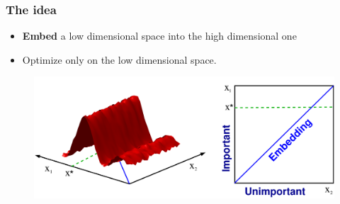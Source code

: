 \documentclass[grey]{beamer}
\begin{document}
  \begin{frame}
  \frametitle{The idea} 
   \begin{itemize}
    \item {\bf \textcolor{myColor}{Embed}} 
     a low dimensional space into the high dimensional one
    \item Optimize
     only on the low dimensional space.
   \end{itemize}

  \begin{figure}[t]
   \includegraphics[width = 0.9\columnwidth]
   {../paper/figures/2to1embedding}
   \label{fig:ESSL_BLR}
  \end{figure}
 \end{frame}
 
\end{document}
